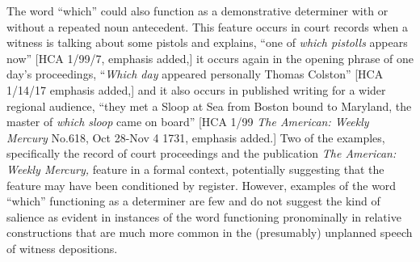   The word “which” could also function as a demonstrative determiner with or without a repeated noun antecedent. This feature occurs in court records when a witness is talking about some pistols and explains, “one of \textit{which pistolls} appears now” [HCA 1/99/7, emphasis added,] it occurs again in the opening phrase of one day’s proceedings, “\textit{Which day} appeared personally Thomas Colston” [HCA 1/14/17 emphasis added,] and it also occurs in published writing for a wider regional audience, “they met a Sloop at Sea from Boston bound to Maryland, the master of \textit{which sloop} came on board” [HCA 1/99 \textit{The American: Weekly Mercury} No.618, Oct 28-Nov 4 1731, emphasis added.] Two of the examples, specifically the record of court proceedings and the publication \textit{The American: Weekly Mercury,} feature in a formal context, potentially suggesting that the feature may have been conditioned by register. However, examples of the word “which” functioning as a determiner are few and do not suggest the kind of salience as evident in instances of the word functioning pronominally in relative constructions that are much more common in the (presumably) unplanned speech of witness depositions. 


